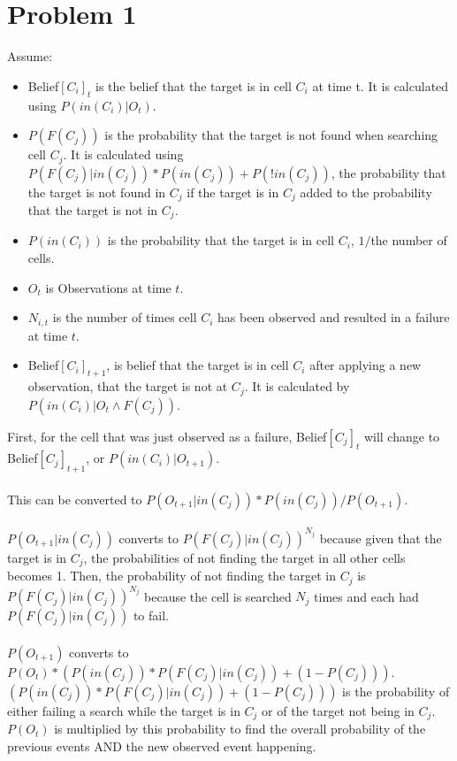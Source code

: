 \documentclass[12pt]{report}
\begin{document}
\section{Problem 1}
Assume:\begin{itemize}
	\item Belief$[C_{i}]_{t}$ is the belief that the target is in cell $C_{i}$ at time {t}. It is calculated using $P(in(C_{i})|O_{t})$.
	\item $P(F(C_{j}))$ is the probability that the target is not found when searching cell $C_{j}$. 
		It is calculated using $P(F(C_{j})|in(C_{j}))*P(in(C_{j}))+P(!in(C_{j}))$, the probability that the target is 
		not found in $C_{j}$ if the target is in $C_{j}$ added to the probability that the target is not in $C_{j}$.
	\item $P(in(C_{i}))$ is the probability that the target is in cell $C_{i}$, $1/$the number of cells.
	\item $O_{t}$ is Observations at time $t$.
	\item $N_{i,t}$ is the number of times cell $C_{i}$ has been observed and resulted in a failure at time $t$.
	\item Belief$[C_{i}]_{t+1}$, is belief that the target is in cell $C_{i}$ after applying a new observation, that the target is not at $C_{j}$. It is calculated by $P(in(C_{i})|O_{t}\land F(C_{j}))$.
\end{itemize}
First, for the cell that was just observed as a failure, Belief$[C_{j}]_{t}$ will change to Belief$[C_{j}]_{t+1}$, or $P(in(C_{i})|O_{t+1})$.\\
\\
This can be converted to $P(O_{t+1}|in(C_{j}))*P(in(C_{j}))/P(O_{t+1})$.\\
\\
$P(O_{t+1}|in(C_{j}))$ converts to $P(F(C_{j})|in(C_{j}))^{N_{j}}$ because given that the target is in $C_{j}$, the probabilities of not finding the target in all other cells becomes 1. Then, the probability of not finding the target in $C_{j}$ is $P(F(C_{j})|in(C_{j}))^{N_{j}}$ because the cell is searched $N_{j}$ times and each had $P(F(C_{j})|in(C_{j}))$ to fail.\\
\\
$P(O_{t+1})$ converts to $P(O_{t})*(P(in(C_{j}))*P(F(C_{j})|in(C_{j}))+(1-P(C_{j})))$.\\
$(P(in(C_{j}))*P(F(C_{j})|in(C_{j}))+(1-P(C_{j})))$ is the probability of either failing a search while the target is in $C_{j}$ or of the target not being in $C_{j}$. $P(O_{t})$ is multiplied by this probability to find the overall probability of the previous events AND the new observed event happening.\\
\end{document}
